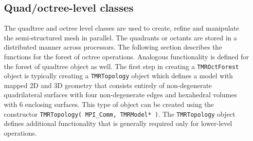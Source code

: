 \documentclass[12pt]{article}
\begin{document}
\subsection{Quad/octree-level classes}

The quadtree and octree level classes are used to create, refine and manipulate the semi-structured mesh in parallel.
The quadrants or octants are stored in a distributed manner across processors.
The following section describes the functions for the forest of octree operations.
Analogous functionality is defined for the forest of quadtree object as well.
The first step in creating a \texttt{TMROctForest} object is typically creating a \texttt{TMRTopology} object which defines a model with mapped 2D and 3D geometry that consists entirely of non-degenerate quadrilateral surfaces with four non-degenerate edges and hexahedral volumes with 6 enclosing surfaces.
This type of object can be created using the constructor \texttt{TMRTopology( MPI\_Comm, TMRModel* )}.
The \texttt{TMRTopology} object defines additional functionality that is generally required only for lower-level operations.
\end{document}
